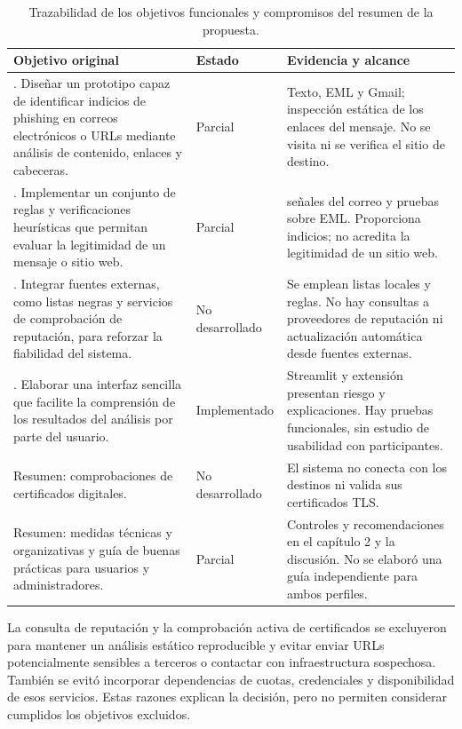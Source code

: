 \begin{table}[H]
\centering\small
\caption{Trazabilidad de los objetivos funcionales y compromisos del resumen de la propuesta.}
\label{tab:objetivos-propuesta}
\begin{tabularx}{\textwidth}{|>{\RaggedRight\arraybackslash}p{5.1cm}|>{\RaggedRight\arraybackslash}p{2.5cm}|>{\RaggedRight\arraybackslash}X|}
\hline
\rowcolor{uemcgreen}\color{white}\bfseries Objetivo original & \color{white}\bfseries Estado & \color{white}\bfseries Evidencia y alcance \\\hline
1. Diseñar un prototipo capaz de identificar indicios de phishing en correos electrónicos o URLs mediante análisis de contenido, enlaces y cabeceras. & Parcial & Texto, EML y Gmail; inspección estática de los enlaces del mensaje. No se visita ni se verifica el sitio de destino. \\\hline
2. Implementar un conjunto de reglas y verificaciones heurísticas que permitan evaluar la legitimidad de un mensaje o sitio web. & Parcial & 31 señales del correo y pruebas sobre EML. Proporciona indicios; no acredita la legitimidad de un sitio web. \\\hline
3. Integrar fuentes externas, como listas negras y servicios de comprobación de reputación, para reforzar la fiabilidad del sistema. & No desarrollado & Se emplean listas locales y reglas. No hay consultas a proveedores de reputación ni actualización automática desde fuentes externas. \\\hline
4. Elaborar una interfaz sencilla que facilite la comprensión de los resultados del análisis por parte del usuario. & Implementado & Streamlit y extensión presentan riesgo y explicaciones. Hay pruebas funcionales, sin estudio de usabilidad con participantes. \\\hline
Resumen: comprobaciones de certificados digitales. & No desarrollado & El sistema no conecta con los destinos ni valida sus certificados TLS. \\\hline
Resumen: medidas técnicas y organizativas y guía de buenas prácticas para usuarios y administradores. & Parcial & Controles y recomendaciones en el capítulo 2 y la discusión. No se elaboró una guía independiente para ambos perfiles. \\\hline
\end{tabularx}
\end{table}

La consulta de reputación y la comprobación activa de certificados se excluyeron para mantener un análisis estático reproducible y evitar enviar URLs potencialmente sensibles a terceros o contactar con infraestructura sospechosa. También se evitó incorporar dependencias de cuotas, credenciales y disponibilidad de esos servicios. Estas razones explican la decisión, pero no permiten considerar cumplidos los objetivos excluidos.

